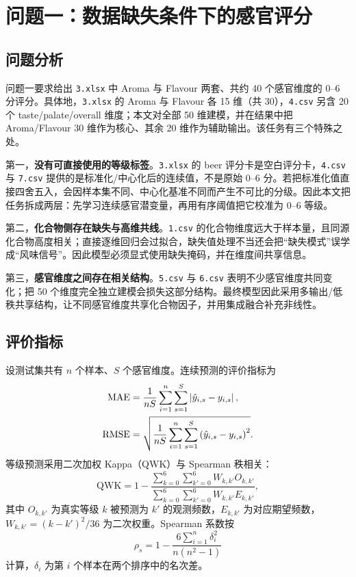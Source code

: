 
\section{问题一：数据缺失条件下的感官评分}
\label{sec:q1}

\subsection{问题分析}

问题一要求给出 \texttt{3.xlsx} 中 Aroma 与 Flavour 两套、共约 40 个感官维度的 0--6 分评分。具体地，\texttt{3.xlsx} 的 Aroma 与 Flavour 各 15 维（共 30），\texttt{4.csv} 另含 20 个 taste/palate/overall 维度；本文对全部 50 维建模，并在结果中把 Aroma/Flavour 30 维作为核心、其余 20 维作为辅助输出。该任务有三个特殊之处。

第一，\textbf{没有可直接使用的等级标签}。\texttt{3.xlsx} 的 beer 评分卡是空白评分卡，\texttt{4.csv} 与 \texttt{7.csv} 提供的是标准化/中心化后的连续值，不是原始 0--6 分。若把标准化值直接四舍五入，会因样本集不同、中心化基准不同而产生不可比的分级。因此本文把任务拆成两层：先学习连续感官潜变量，再用有序阈值把它校准为 0--6 等级。

第二，\textbf{化合物侧存在缺失与高维共线}。\texttt{1.csv} 的化合物维度远大于样本量，且同源化合物高度相关；直接逐维回归会过拟合，缺失值处理不当还会把“缺失模式”误学成“风味信号”。因此模型必须显式使用缺失掩码，并在维度间共享信息。

第三，\textbf{感官维度之间存在相关结构}。\texttt{5.csv} 与 \texttt{6.csv} 表明不少感官维度共同变化；把 50 个维度完全独立建模会损失这部分结构。最终模型因此采用多输出/低秩共享结构，让不同感官维度共享化合物因子，并用集成融合补充非线性。

\subsection{评价指标}

设测试集共有 $n$ 个样本、$S$ 个感官维度。连续预测的评价指标为
\begin{align}
  \mathrm{MAE} &= \frac{1}{nS}\sum_{i=1}^{n}\sum_{s=1}^{S}\left\lvert \hat{y}_{i,s}-y_{i,s} \right\rvert,
  \label{eq:mae}\\
  \mathrm{RMSE} &= \sqrt{\frac{1}{nS}\sum_{i=1}^{n}\sum_{s=1}^{S}\left(\hat{y}_{i,s}-y_{i,s}\right)^2}.
  \label{eq:rmse}
\end{align}
等级预测采用二次加权 Kappa（QWK）与 Spearman 秩相关：
\begin{equation}
  \mathrm{QWK}=1-\frac{\sum_{k=0}^{6}\sum_{k'=0}^{6}W_{k,k'}O_{k,k'}}
  {\sum_{k=0}^{6}\sum_{k'=0}^{6}W_{k,k'}E_{k,k'}},
  \label{eq:qwk}
\end{equation}
其中 $O_{k,k'}$ 为真实等级 $k$ 被预测为 $k'$ 的观测频数，$E_{k,k'}$ 为对应期望频数，$W_{k,k'}=(k-k')^2/36$ 为二次权重\citep{cohen1968weighted}。Spearman 系数按
\begin{equation}
  \rho_s=1-\frac{6\sum_{i=1}^{n}\delta_i^2}{n(n^2-1)}
  \label{eq:spearman}
\end{equation}
计算，$\delta_i$ 为第 $i$ 个样本在两个排序中的名次差\citep{spearman1904proof}。

